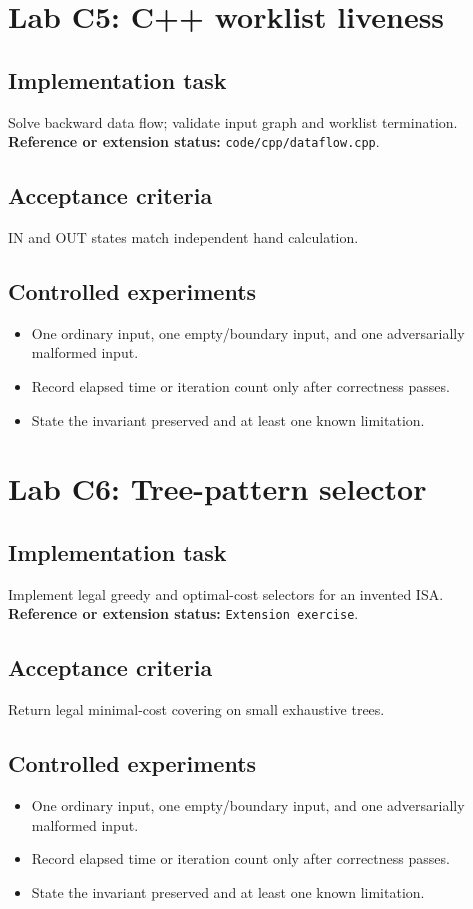 \documentclass[10pt,letterpaper]{article}
\begin{document}
\section{Lab C5: C++ worklist liveness}
\subsection{Implementation task}
Solve backward data flow; validate input graph and worklist termination.
\textbf{Reference or extension status:} \texttt{code/cpp/dataflow.cpp}.\par\subsection{Acceptance criteria}
IN and OUT states match independent hand calculation.
\subsection{Controlled experiments}
\begin{itemize}
\item One ordinary input, one empty/boundary input, and one adversarially malformed input.
\item Record elapsed time or iteration count only after correctness passes.
\item State the invariant preserved and at least one known limitation.
\end{itemize}


\section{Lab C6: Tree-pattern selector}
\subsection{Implementation task}
Implement legal greedy and optimal-cost selectors for an invented ISA.
\textbf{Reference or extension status:} \texttt{Extension exercise}.\par\subsection{Acceptance criteria}
Return legal minimal-cost covering on small exhaustive trees.
\subsection{Controlled experiments}
\begin{itemize}
\item One ordinary input, one empty/boundary input, and one adversarially malformed input.
\item Record elapsed time or iteration count only after correctness passes.
\item State the invariant preserved and at least one known limitation.
\end{itemize}
\end{document}
